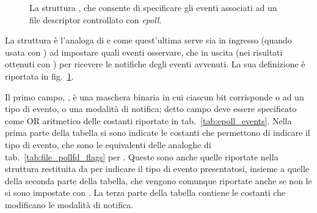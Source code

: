 \begin{figure}[!htb]
  \footnotesize \centering
  \begin{minipage}[c]{0.90\textwidth}
  \end{minipage} 
  \normalsize 
  \caption{La struttura , che consente di specificare
    gli eventi associati ad un file descriptor controllato con
    \textit{epoll}.}
  \label{fig:epoll_event}
\end{figure}

La struttura  è l'analoga di  e come
quest'ultima serve sia in ingresso (quando usata con ) ad
impostare quali eventi osservare, che in uscita (nei risultati ottenuti con
) per ricevere le notifiche degli eventi avvenuti.  La sua
definizione è riportata in fig.~\ref{fig:epoll_event}. 

Il primo campo, , è una maschera binaria in cui ciascun bit
corrisponde o ad un tipo di evento, o una modalità di notifica; detto campo
deve essere specificato come OR aritmetico delle costanti riportate in
tab.~\ref{tab:epoll_events}. Nella prima parte della tabella si sono indicate
le costanti che permettono di indicare il tipo di evento, che sono le
equivalenti delle analoghe di tab.~\ref{tab:file_pollfd_flags} per
. Queste sono anche quelle riportate nella struttura
 restituita da  per indicare il tipo di
evento presentatosi, insieme a quelle della seconda parte della tabella, che
vengono comunque riportate anche se non le si sono impostate con
. La terza parte della tabella contiene le costanti che
modificano le modalità di notifica.

